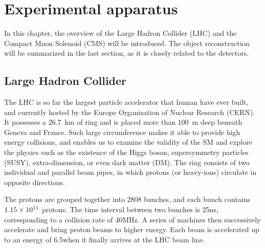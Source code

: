 \chapter{Experimental apparatus}
\label{Chap:CMS}
In this chapter, the overview of the Large Hadron Collider (LHC) and the Compact Muon Solenoid (CMS) will be introduced. The object reconstruction will be summarized in the last section, as it is closely related to the detectors. 

\section{Large Hadron Collider}
The LHC is so far the largest particle accelerator that human have ever built, and currently hosted by the Europe Organization of Nuclear Research (CERN). 
It possesses a 26.7~km of ring and is placed more than 100~m deep beneath Geneva and France. Such large circumference makes it able to provide high energy collisions, and enables us to examine the validity of the SM and explore the physics such as the existence of the Higgs boson, supersymmetry particles (SUSY), extra-dimension, or even dark matter (DM). The ring consists of two individual and parallel beam pipes, in which protons (or heavy-ions) circulate in opposite directions. 

The protons are grouped together into 2808 bunches, and each bunch contains $1.15\times \text{10}^\text{11}$ protons. The time interval between two bunches is 25\unit{ns}, corresponding to a collision rate of 40\unit{MHz}.
A series of machines then successively accelerate and bring proton beams to higher energy. Each beam is accelerated up to an energy of 6.5\TeV when it finally arrives at the LHC beam line. 

